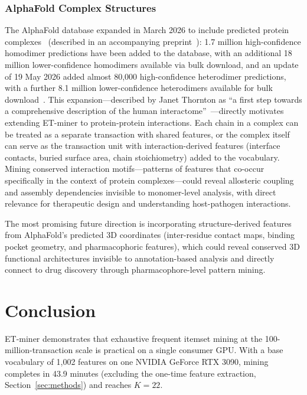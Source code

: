 \documentclass[10pt,a4paper,twocolumn]{article}
\begin{document}
\subsubsection*{AlphaFold Complex Structures}

The AlphaFold database expanded in March 2026 to include predicted protein complexes~\cite{afdb2026news} (described in an accompanying preprint~\cite{han2026afdb}): 1.7 million high-confidence homodimer predictions have been added to the database, with an additional 18 million lower-confidence homodimers available via bulk download, and an update of 19 May 2026 added almost 80,000 high-confidence heterodimer predictions, with a further 8.1 million lower-confidence heterodimers available for bulk download~\cite{afdb2026news}. This expansion---described by Janet Thornton as ``a first step towards a comprehensive description of the human interactome''~\cite{afdb2026news}---directly motivates extending ET-miner to protein-protein interactions. Each chain in a complex can be treated as a separate transaction with shared features, or the complex itself can serve as the transaction unit with interaction-derived features (interface contacts, buried surface area, chain stoichiometry) added to the vocabulary. Mining conserved interaction motifs---patterns of features that co-occur specifically in the context of protein complexes---could reveal allosteric coupling and assembly dependencies invisible to monomer-level analysis, with direct relevance for therapeutic design and understanding host-pathogen interactions.

The most promising future direction is incorporating structure-derived features from AlphaFold's predicted 3D coordinates (inter-residue contact maps, binding pocket geometry, and pharmacophoric features), which could reveal conserved 3D functional architectures invisible to annotation-based analysis and directly connect to drug discovery through pharmacophore-level pattern mining.
\setlength{\parindent}{1em}%

\section{Conclusion}
\label{sec:conclusion}

ET-miner demonstrates that exhaustive frequent itemset mining at the 100-million-transaction scale is practical on a single consumer GPU. With a base vocabulary of 1,002 features on one NVIDIA GeForce RTX 3090, mining completes in 43.9 minutes (excluding the one-time feature extraction, Section~\ref{sec:methods}) and reaches $K{=}22$.
\end{document}
